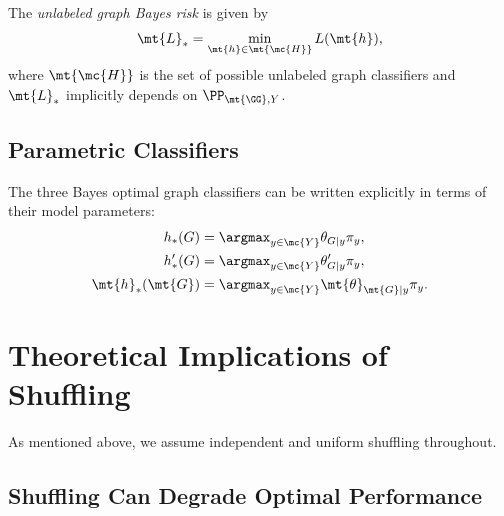 \documentclass[10pt,journal,cspaper,compsoc]{IEEEtran}
\begin{document}

The \emph{unlabeled graph Bayes risk} is given by %
\begin{align}
	\mt{L}_* =\min_{\mt{h} \in \mt{\mc{H}}} L(\mt{h}),
\end{align}
where $\mt{\mc{H}}$ is the set of possible unlabeled graph classifiers
and $\mt{L}_*$ implicitly depends on $\PP_{\mt{\GG},Y}$.  


\subsection{Parametric Classifiers} %
\label{sub:parametric_classifiers}


The three Bayes optimal graph classifiers can be written explicitly in terms of their model parameters:
\begin{align}
	h_*(G) &= \argmax_{y \in \mc{Y}} \theta_{G|y}\pi_y, \label{eq:La_Bayes} \\
	h_*'(G) &= \argmax_{y \in \mc{Y}} \theta_{G|y}' \pi_y,  \label{eq:Sh_Bayes} \\
	\mt{h}_*(\mt{G}) &= \argmax_{y \in \mc{Y}}  \mt{\theta}_{\mt{G}|y}\pi_y. \label{eq:Un_Bayes}
\end{align}




\section{Theoretical Implications of Shuffling} %
\label{sec:theoretical_results}

As mentioned above, we assume independent and uniform shuffling throughout.

\subsection{Shuffling Can Degrade Optimal Performance} %
\label{sec:shuffle}
\end{document}
